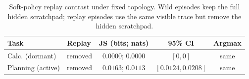 \begin{table}[t]
\centering
\small
\begin{tabular}{llccc}
\toprule
Task & Replay & JS (bits; nats) & 95\% CI & Argmax \\
\midrule
Calc. (dormant) & removed & $0.0000$; $0.0000$ & $[0,0]$ & same \\
Planning (active) & removed & $0.0163$; $0.0113$ & $[0.0124,0.0208]$ & same \\
\bottomrule
\end{tabular}
\caption[Soft-policy replay contrast.]{Soft-policy replay contrast under fixed
topology. Wild episodes keep the full hidden scratchpad; replay episodes use the
same visible trace but remove the hidden scratchpad.}
\label{tab:replay-results}
\end{table}
